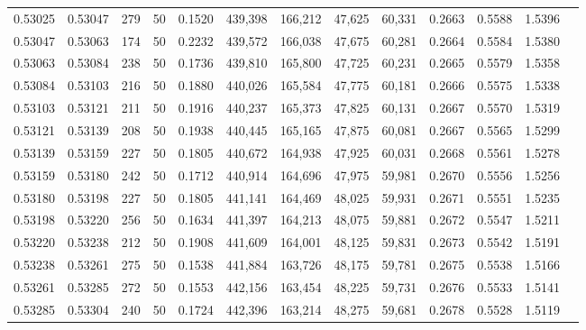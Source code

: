 \begin{tabular}{rrrrrrrrrrrrr}
0.53025 & 0.53047 &   279 &  50 &                                     0.1520 & 439,398 & 166,212 &  47,625 &  60,331 & 0.2663 & 0.5588 & 1.5396 \\
0.53047 & 0.53063 &   174 &  50 &                                     0.2232 & 439,572 & 166,038 &  47,675 &  60,281 & 0.2664 & 0.5584 & 1.5380 \\
0.53063 & 0.53084 &   238 &  50 &                                     0.1736 & 439,810 & 165,800 &  47,725 &  60,231 & 0.2665 & 0.5579 & 1.5358 \\
0.53084 & 0.53103 &   216 &  50 &                                     0.1880 & 440,026 & 165,584 &  47,775 &  60,181 & 0.2666 & 0.5575 & 1.5338 \\
0.53103 & 0.53121 &   211 &  50 &                                     0.1916 & 440,237 & 165,373 &  47,825 &  60,131 & 0.2667 & 0.5570 & 1.5319 \\
0.53121 & 0.53139 &   208 &  50 &                                     0.1938 & 440,445 & 165,165 &  47,875 &  60,081 & 0.2667 & 0.5565 & 1.5299 \\
0.53139 & 0.53159 &   227 &  50 &                                     0.1805 & 440,672 & 164,938 &  47,925 &  60,031 & 0.2668 & 0.5561 & 1.5278 \\
0.53159 & 0.53180 &   242 &  50 &                                     0.1712 & 440,914 & 164,696 &  47,975 &  59,981 & 0.2670 & 0.5556 & 1.5256 \\
0.53180 & 0.53198 &   227 &  50 &                                     0.1805 & 441,141 & 164,469 &  48,025 &  59,931 & 0.2671 & 0.5551 & 1.5235 \\
0.53198 & 0.53220 &   256 &  50 &                                     0.1634 & 441,397 & 164,213 &  48,075 &  59,881 & 0.2672 & 0.5547 & 1.5211 \\
0.53220 & 0.53238 &   212 &  50 &                                     0.1908 & 441,609 & 164,001 &  48,125 &  59,831 & 0.2673 & 0.5542 & 1.5191 \\
0.53238 & 0.53261 &   275 &  50 &                                     0.1538 & 441,884 & 163,726 &  48,175 &  59,781 & 0.2675 & 0.5538 & 1.5166 \\
0.53261 & 0.53285 &   272 &  50 &                                     0.1553 & 442,156 & 163,454 &  48,225 &  59,731 & 0.2676 & 0.5533 & 1.5141 \\
0.53285 & 0.53304 &   240 &  50 &                                     0.1724 & 442,396 & 163,214 &  48,275 &  59,681 & 0.2678 & 0.5528 & 1.5119 \\

\end{tabular}
